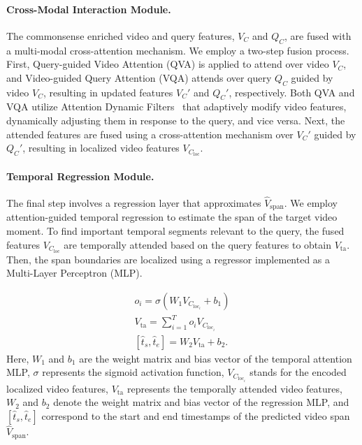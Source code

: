 \paragraph{Cross-Modal Interaction Module.} The commonsense enriched video and query features, \(V_{C}\) and \(Q_{C}\), are fused with a multi-modal cross-attention mechanism. We employ a two-step fusion process. First, Query-guided Video Attention (QVA) is applied to attend over video $V_C$, and Video-guided Query Attention (VQA) attends over query $Q_C$ guided by video $V_C$, resulting in updated features $V_C'$ and $Q_C'$, respectively. Both QVA and VQA utilize Attention Dynamic Filters~\cite{rodriguez_proposal-free_2020} that adaptively modify video features, dynamically adjusting them in response to the query, and vice versa. Next, the attended features are fused using a cross-attention mechanism over $V_C'$ guided by $Q_C'$, resulting in localized video features $V_{C_{\text{loc}}}$.

\paragraph{Temporal Regression Module.}
The final step involves a regression layer that approximates $\hat{V}_{\text{span}}$. We employ attention-guided temporal regression to estimate the span of the target video moment. To find important temporal segments relevant to the query, the fused features $V_{C_{\text{loc}}}$ are temporally attended based on the query features to obtain $V_{\text{ta}}$. Then, the span boundaries are localized using a regressor implemented as a Multi-Layer Perceptron (MLP).

\begin{align}
{o}_i = \sigma\left({W}_{1} V_{C_{\text{loc}_i}} + {b}_{{1}}\right) \\
V_{\text{ta}} = \sum_{i=1}^{T} o_i V_{C_{\text{loc}_{i}}} \\
[\hat{t}_s, \hat{t}_e] = {W}_2 {V}_{\text{ta}} + {b}_{2}.
\end{align}
Here, ${W}_{1}$ and ${b}_1$ are the weight matrix and bias vector of the temporal attention MLP, $\sigma$ represents the sigmoid activation function, $V_{C_{\text{loc}_i}}$ stands for the encoded localized video features, ${V}_{\text{ta}}$ represents the temporally attended video features, ${W}_2$ and ${b}_2$ denote the weight matrix and bias vector of the regression MLP, and $[\hat{t}_s, \hat{t}_e]$ correspond to the start and end timestamps of the predicted video span $\hat{V}_{\text{span}}$.

